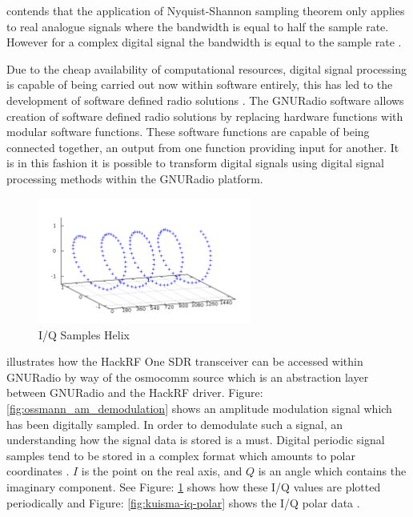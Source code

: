 \documentclass[runningheads,a4paper]{llncs}
\begin{document}
\cite{ossmann-15-b} contends that the application of Nyquist-Shannon sampling theorem only applies to real analogue signals where the bandwidth is equal to half the sample rate. However for a complex digital signal  the bandwidth is equal to the sample rate \citep{ossmann-15-b}.

Due to the cheap availability of computational resources, digital signal processing is capable of being carried out now within software entirely, this has led to the development of software defined radio solutions \citep{freidt-13}. The GNURadio software allows creation of software defined radio solutions by replacing hardware functions with modular software functions. These software functions are capable of being connected together, an output from one function providing input for another. It is in this fashion it is possible to transform digital signals using digital signal processing methods within the GNURadio platform\citep{gnuradio-14}.

%
\begin{figure}[here]
\centering
\includegraphics[width=7cm]{images/48}
\caption{I/Q Samples Helix \citep{kuisma-14}}
\label{fig:kuisma-iq-helix}
\end{figure}
%

\cite{ossmann-15-a} illustrates how the HackRF One \gls{SDR} transceiver can be accessed within GNURadio by way of the osmocomm source which is an abstraction layer between GNURadio and the HackRF driver. Figure: \ref{fig:ossmann_am_demodulation} shows an amplitude modulation signal which has been digitally sampled. In order to demodulate such a signal, an understanding how the signal data is stored is a must. Digital periodic signal samples tend to be stored in a complex format which amounts to polar coordinates \citep{ossmann-15-c}. $I$ is the point on the real axis, and $Q$ is an angle which contains the imaginary component. See Figure: \ref{fig:kuisma-iq-helix} shows how these I/Q values are plotted periodically and Figure: \ref{fig:kuisma-iq-polar} shows the I/Q polar data \cite{kuisma-14}.
\end{document}
